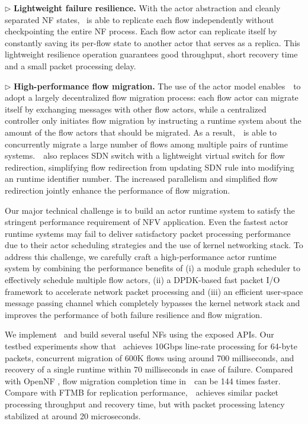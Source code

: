 $\triangleright$ \textbf{Lightweight failure resilience.} With the actor abstraction and cleanly separated NF states, \nfactor~is able to replicate each flow independently without checkpointing the entire NF process. Each flow actor can replicate itself by constantly saving its per-flow state to another actor that serves as a replica.
This lightweight resilience operation guarantees good throughput, short recovery time and a small packet processing delay.

$\triangleright$ \textbf{High-performance flow migration.} The use of the actor model enables~\nfactor~to adopt a largely decentralized flow migration process: each flow actor can migrate itself by exchanging messages with other flow actors, while a centralized controller only initiates flow migration by instructing a runtime system about the amount of the flow actors that should be migrated. As a result,~\nfactor~is able to concurrently migrate a large number of flows among multiple pairs of runtime systems.~\nfactor~also replaces SDN switch with a lightweight virtual switch for flow redirection, simplifying flow redirection from updating SDN rule into modifying an runtime identifier number. %
The increased parallelism and simplified flow redirection jointly enhance the performance of flow migration.

Our major technical challenge is to build an actor runtime system to satisfy the stringent performance requirement of NFV application. Even the fastest actor runtime systems \cite{chs-rapc-16} may fail to deliver satisfactory packet processing performance due to their actor scheduling strategies and the use of kernel networking stack. To address this challenge, we carefully craft a high-performance actor runtime system by combining the performance benefits of (i) a module graph scheduler to effectively schedule multiple flow actors, (ii) a DPDK-based \cite{dpdk} fast packet I/O framework \cite{bess} to accelerate network packet processing and (iii) an efficient user-space message passing channel which completely bypasses the kernel network stack and improves the performance of both failure resilience and flow migration.

We implement \nfactor~and build several useful NFs using the exposed APIs. Our testbed experiments show that \nfactor~achieves 10Gbps line-rate processing for 64-byte packets, concurrent migration of 600K flows using around 700 milliseconds, and recovery of a single runtime within 70 milliseconds in case of failure. Compared with OpenNF \cite{gember2015opennf}, flow migration completion time in~\nfactor~can be 144 times faster. Compare with FTMB \cite{sherry2015rollback} for replication performance,~\nfactor~achieves similar packet processing throughput and recovery time, but with packet processing latency stabilized at around 20 microseconds. %

